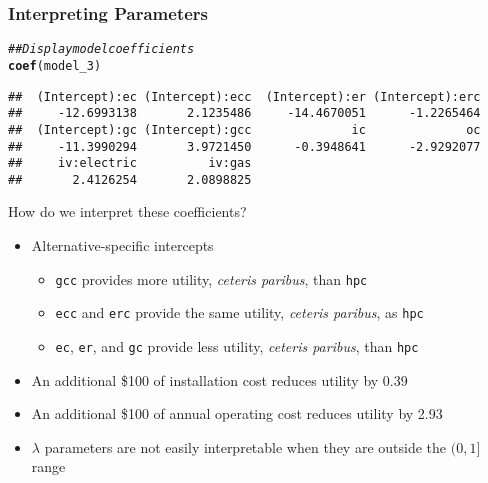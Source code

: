 \documentclass{beamer}\usepackage[]{graphicx}\usepackage[]{xcolor}
\makeatletter
\newcommand{\hlcom}[1]{\textcolor[rgb]{0.678,0.584,0.686}{\textit{#1}}}%
\newcommand{\hlstd}[1]{\textcolor[rgb]{0.345,0.345,0.345}{#1}}%
\newcommand{\hlkwd}[1]{\textcolor[rgb]{0.737,0.353,0.396}{\textbf{#1}}}%
\newenvironment{kframe}{%
 \def\at@end@of@kframe{}%
 \ifinner\ifhmode%
  \def\at@end@of@kframe{\end{minipage}}%
  \begin{minipage}{\columnwidth}%
 \fi\fi%
 \def\FrameCommand##1{\hskip\@totalleftmargin \hskip-\fboxsep
 \colorbox{shadecolor}{##1}\hskip-\fboxsep
     \hskip-\linewidth \hskip-\@totalleftmargin \hskip\columnwidth}%
 \MakeFramed {\advance\hsize-\width
   \@totalleftmargin\z@ \linewidth\hsize
   \@setminipage}}%
 {\par\unskip\endMakeFramed%
 \at@end@of@kframe}
\newenvironment{knitrout}{}{} %
\makeatother
\begin{document}
\begin{frame}[fragile]\frametitle{Interpreting Parameters}
\begin{knitrout}\footnotesize
{}\color{fgcolor}\begin{kframe}
\begin{alltt}
\hlcom{## Display model coefficients}
\hlkwd{coef}\hlstd{(model_3)}
\end{alltt}
\begin{verbatim}
##  (Intercept):ec (Intercept):ecc  (Intercept):er (Intercept):erc 
##     -12.6993138       2.1235486     -14.4670051      -1.2265464 
##  (Intercept):gc (Intercept):gcc              ic              oc 
##     -11.3990294       3.9721450      -0.3948641      -2.9292077 
##     iv:electric          iv:gas 
##       2.4126254       2.0898825
\end{verbatim}
\end{kframe}
\end{knitrout}
    \vspace{2ex}
    How do we interpret these coefficients?
    \begin{itemize}
    	\item Alternative-specific intercepts
    	\begin{itemize}
    		\item \texttt{gcc} provides more utility, \emph{ceteris paribus}, than \texttt{hpc}
	      \item \texttt{ecc} and \texttt{erc} provide the same utility, \emph{ceteris paribus}, as \texttt{hpc}
	      \item \texttt{ec}, \texttt{er}, and \texttt{gc} provide less utility, \emph{ceteris paribus}, than \texttt{hpc}
    	\end{itemize}
        \item An additional \$100 of installation cost reduces utility by 0.39
        \item An additional \$100 of annual operating cost reduces utility by 2.93
        \item $\lambda$ parameters are not easily interpretable when they are outside the $(0, 1]$ range
    \end{itemize}
\end{frame}
\end{document}
